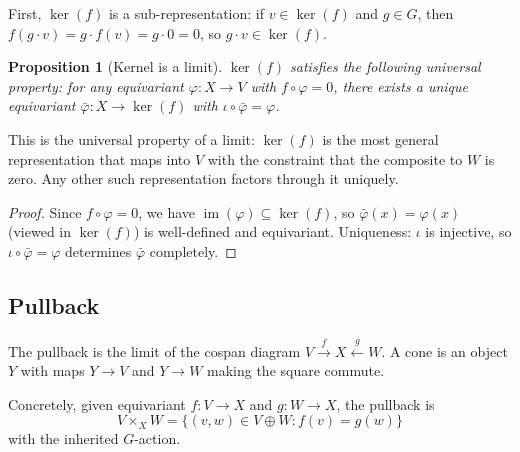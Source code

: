 \documentclass[12pt,a4paper]{article}
\newtheorem{proposition}[theorem]{Proposition}
\theoremstyle{definition}
\theoremstyle{remark}
\newcommand{\im}{\operatorname{im}}
\begin{document}
First, $\ker(f)$ is a sub-representation: if $v \in \ker(f)$ and $g \in G$, then
$f(g \cdot v) = g \cdot f(v) = g \cdot 0 = 0$, so $g \cdot v \in \ker(f)$.

\begin{proposition}[Kernel is a limit]
$\ker(f)$ satisfies the following universal property: for any equivariant
$\varphi\colon X \to V$ with $f \circ \varphi = 0$, there exists a unique equivariant
$\bar\varphi\colon X \to \ker(f)$ with $\iota \circ \bar\varphi = \varphi$.
\end{proposition}

\begin{center}
\end{center}

This is the universal property of a limit: $\ker(f)$ is the most general
representation that maps into $V$ with the constraint that the composite
to $W$ is zero. Any other such representation factors through it uniquely.

\begin{proof}
Since $f \circ \varphi = 0$, we have $\im(\varphi) \subseteq \ker(f)$, so
$\bar\varphi(x) = \varphi(x)$ (viewed in $\ker(f)$) is well-defined and
equivariant. Uniqueness: $\iota$ is injective, so $\iota \circ \bar\varphi
= \varphi$ determines $\bar\varphi$ completely.
\end{proof}

\subsection{Pullback}

The pullback is the limit of the cospan diagram $V \xrightarrow{f} X \xleftarrow{g} W$.
A cone is an object $Y$ with maps $Y \to V$ and $Y \to W$ making the square commute.

Concretely, given equivariant $f\colon V \to X$ and $g\colon W \to X$, the pullback is
\[
V \times_X W = \{(v,w) \in V \oplus W : f(v) = g(w)\}
\]
with the inherited $G$-action.

\medskip
\begin{center}
\end{center}
\end{document}
